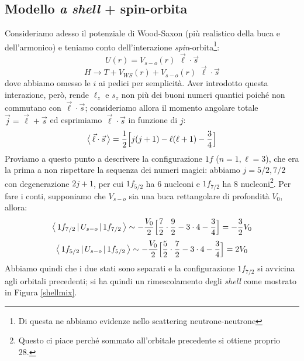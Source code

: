 \subsection{Modello \textit{a shell} + spin-orbita}
Consideriamo adesso il potenziale di Wood-Saxon (più realistico della buca e dell'armonico) e teniamo conto dell'interazione \textit{spin}-orbita\footnote{Di questa ne abbiamo evidenze nello scattering neutrone-neutrone}:
$$U (r) = V_{s-o}(r)\; \vec{\ell} \cdot \vec{s} $$
$$ H \to T+V_{WS}(r)+V_{s-o}(r)\;\vec{\ell} \cdot \vec{s}$$
dove abbiamo omesso le $i$ ai pedici per semplicità. Aver introdotto questa interazione, però, rende $\ell_z$ e $s_z$ non più dei buoni numeri quantici poiché non commutano con $\vec{\ell}\cdot\vec{s}$; consideriamo allora il momento angolare totale $\vec{j}= \vec{\ell} + \vec{s}$ ed esprimiamo $\vec{\ell}\cdot\vec{s}$ in funzione di $j$:
$$\bigl\langle\, \vec{\ell}\cdot\vec{s}\, \bigr\rangle = \frac{1}{2}\Bigl[j(j+1) - \ell(\ell+1) - \frac{3}{4} \Bigr]$$
Proviamo a questo punto a descrivere la configurazione $1f$ ($n=1,\ell=3$), che era la prima a non rispettare la sequenza dei numeri magici: abbiamo $j=5/2,7/2$ con degenerazione $2j+1$, per cui $1f_{5/2}$ ha 6 nucleoni e $1f_{7/2}$ ha 8 nucleoni\footnote{Questo ci piace perché sommato all'orbitale precedente si ottiene proprio 28.}. Per fare i conti, supponiamo che $V_{s-o}$ sia una buca rettangolare di profondità $V_0$, allora:
$$\bigl\langle\, 1f_{7/2}\, |\,U_{s-o}\, |\,1f_{7/2}\, \bigr\rangle \sim - \frac{V_0}{2}\Bigl[ \frac{7}{2}\cdot\frac{9}{2} - 3\cdot 4 - \frac{3}{4} \Bigr] = -\frac{3}{2} V_0$$
$$\bigl\langle\, 1f_{5/2}\, |\,U_{s-o}\, |\,1f_{5/2}\, \bigr\rangle \sim - \frac{V_0}{2}\Bigl[ \frac{5}{2}\cdot\frac{7}{2} - 3\cdot 4 - \frac{3}{4} \Bigr] = 2 V_0$$
Abbiamo quindi che i due stati sono separati e la configurazione $1f_{7/2}$ si avvicina agli orbitali precedenti; si ha quindi un rimescolamento degli \textit{shell} come mostrato in Figura \ref{shellmix}.
